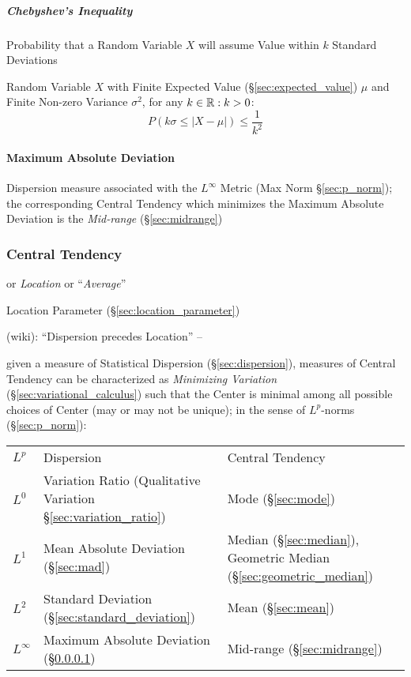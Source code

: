 \subparagraph{Chebyshev's Inequality}\label{sec:chebyshevs_inequality}\hfill

Probability that a Random Variable $X$ will assume Value within $k$ Standard
Deviations

Random Variable $X$ with Finite Expected Value (\S\ref{sec:expected_value})
$\mu$ and Finite Non-zero Variance $\sigma^2$, for any $k \in \mathbb{R} : k > 0$:
\[
  P(k\sigma \leq |X - \mu|) \leq \frac{1}{k^2}
\]



\paragraph{Maximum Absolute Deviation}
\label{sec:maximum_absolute_deviation}\hfill

Dispersion measure associated with the $L^\infty$ Metric (Max Norm
\S\ref{sec:p_norm}); the corresponding Central Tendency which minimizes the
Maximum Absolute Deviation is the \emph{Mid-range} (\S\ref{sec:midrange})



\subsubsection{Central Tendency}\label{sec:central_tendency}

or \emph{Location} or ``\emph{Average}''

\fist Location Parameter (\S\ref{sec:location_parameter})

(wiki): ``Dispersion precedes Location'' --

given a measure of Statistical Dispersion (\S\ref{sec:dispersion}), measures of
Central Tendency can be characterized as \emph{Minimizing Variation}
(\S\ref{sec:variational_calculus}) such that the Center is minimal among all
possible choices of Center (may or may not be unique); in the sense of
$L^p$-norms (\S\ref{sec:p_norm}):
\begin{tabular}{l l l}
  $L^p$ & Dispersion & Central Tendency \\
  $L^0$ & Variation Ratio (Qualitative Variation \S\ref{sec:variation_ratio})
    & Mode (\S\ref{sec:mode}) \\
  $L^1$ & Mean Absolute Deviation (\S\ref{sec:mad})
    & Median (\S\ref{sec:median}),
      Geometric Median (\S\ref{sec:geometric_median}) \\
  $L^2$ & Standard Deviation (\S\ref{sec:standard_deviation})
    & Mean (\S\ref{sec:mean}) \\
  $L^\infty$
    & Maximum Absolute Deviation (\S\ref{sec:maximum_absolute_deviation})
    & Mid-range (\S\ref{sec:midrange})
\end{tabular}



